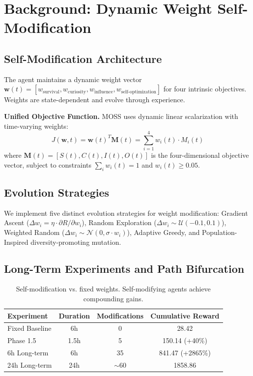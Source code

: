 \documentclass[11pt]{article}
\begin{document}
\section{Background: Dynamic Weight Self-Modification}

\subsection{Self-Modification Architecture}

The agent maintains a dynamic weight vector $\mathbf{w}(t) = [w_{\text{survival}}, w_{\text{curiosity}}, w_{\text{influence}}, w_{\text{self-optimization}}]$ for four intrinsic objectives. Weights are state-dependent and evolve through experience.

\textbf{Unified Objective Function.} MOSS uses dynamic linear scalarization with time-varying weights:
\begin{equation}
J(\mathbf{w}, t) = \mathbf{w}(t)^T \mathbf{M}(t) = \sum_{i=1}^{4} w_i(t) \cdot M_i(t)
\end{equation}
where $\mathbf{M}(t) = [S(t), C(t), I(t), O(t)]$ is the four-dimensional objective vector, subject to constraints $\sum_{i} w_i(t) = 1$ and $w_i(t) \geq 0.05$.

\subsection{Evolution Strategies}

We implement five distinct evolution strategies for weight modification: Gradient Ascent ($\Delta w_i = \eta \cdot \partial R / \partial w_i$), Random Exploration ($\Delta w_i \sim \mathcal{U}(-0.1, 0.1)$), Weighted Random ($\Delta w_i \sim \mathcal{N}(0, \sigma \cdot w_i)$), Adaptive Greedy, and Population-Inspired diversity-promoting mutation.

\subsection{Long-Term Experiments and Path Bifurcation}

\begin{table}[h]
\centering
\begin{tabular}{lccc}
\toprule
Experiment & Duration & Modifications & Cumulative Reward \\
\midrule
Fixed Baseline & 6h & 0 & 28.42 \\
Phase 1.5 & 1.5h & 5 & 150.14 (+40\%) \\
6h Long-term & 6h & 35 & 841.47 (+2865\%) \\
24h Long-term & 24h & $\sim$60 & 1858.86 \\
\bottomrule
\end{tabular}
\caption{Self-modification vs. fixed weights. Self-modifying agents achieve compounding gains.}
\label{tab:performance}
\end{table}
\end{document}

